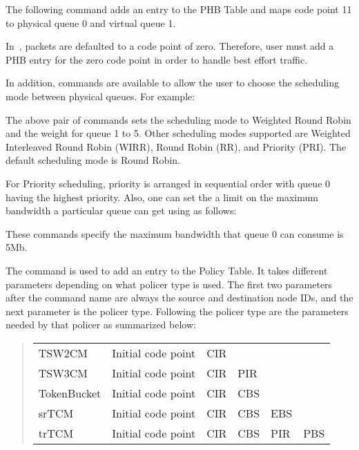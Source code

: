 The following command adds an entry to the PHB Table and 
  maps code point 11 to physical queue 0 and virtual queue 1. 


In~\ns, packets are defaulted to a code point of zero.
Therefore, user must add a PHB entry for the zero code point in order to 
 handle best effort traffic.

In addition, commands are available to allow the user to choose the 
  scheduling mode between physical queues. 
For example:



The above pair of commands sets the scheduling mode to Weighted Round Robin 
  and the weight for queue 1 to 5. 
Other scheduling modes supported are 
  Weighted Interleaved Round Robin (WIRR), Round Robin (RR), 
  and Priority (PRI). 
The default scheduling mode is Round Robin.

For Priority scheduling, 
  priority is arranged in sequential order with 
  queue 0 having the highest priority. 
Also, one can set the a limit on the maximum bandwidth 
  a particular queue can get using as follows:



These commands specify the maximum bandwidth that 
  queue 0 can consume is 5Mb.

The  command is used to 
  add an entry to the Policy Table.  
It takes different parameters depending on what policer type is used.  
The first two parameters after the command name are always 
  the source and destination node IDs, 
  and the next parameter is the policer type. 
Following the policer type are the parameters needed by that policer as 
summarized below:

\begin{quote}
\begin{tabular}{llllll}
TSW2CM&{Initial code point}&CIR\\
TSW3CM&{Initial code point}&CIR&PIR\\
TokenBucket&{Initial code point}&CIR&CBS\\
srTCM&{Initial code point}&CIR&CBS&EBS\\
trTCM&{Initial code point}&CIR&CBS&PIR&PBS
\end{tabular}
\end{quote}
 
